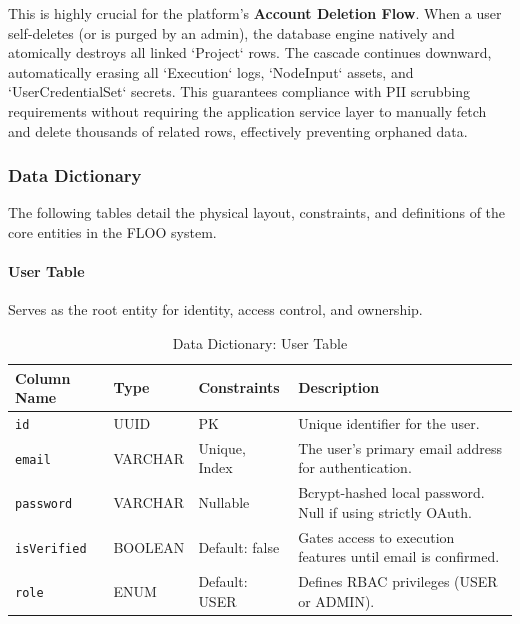 This is highly crucial for the platform's \textbf{Account Deletion Flow}. When a user self-deletes (or is purged by an admin), the database engine natively and atomically destroys all linked `Project` rows. The cascade continues downward, automatically erasing all `Execution` logs, `NodeInput` assets, and `UserCredentialSet` secrets. This guarantees compliance with PII scrubbing requirements without requiring the application service layer to manually fetch and delete thousands of related rows, effectively preventing orphaned data.


\subsubsection{Data Dictionary}
The following tables detail the physical layout, constraints, and definitions of the core entities in the FLOO system.

\paragraph{User Table}
Serves as the root entity for identity, access control, and ownership.
\begin{table}[H]
\centering
\renewcommand{\arraystretch}{1.3}
\begin{tabularx}{\textwidth}{|l|l|l|X|}
\hline
\textbf{Column Name} & \textbf{Type} & \textbf{Constraints} & \textbf{Description} \\
\hline
\texttt{id} & UUID & PK & Unique identifier for the user. \\
\hline
\texttt{email} & VARCHAR & Unique, Index & The user's primary email address for authentication. \\
\hline
\texttt{password} & VARCHAR & Nullable & Bcrypt-hashed local password. Null if using strictly OAuth. \\
\hline
\texttt{isVerified} & BOOLEAN & Default: false & Gates access to execution features until email is confirmed. \\
\hline
\texttt{role} & ENUM & Default: USER & Defines RBAC privileges (USER or ADMIN). \\
\hline
\end{tabularx}
\caption{Data Dictionary: User Table}
\label{tab:dict-user}
\end{table}

